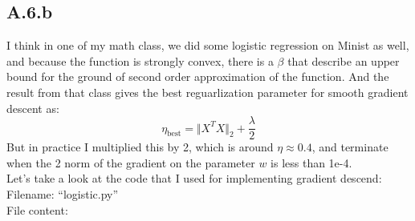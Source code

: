 \documentclass[]{article}
\begin{document}
    \subsection*{A.6.b}
        I think in one of my math class, we did some logistic regression on Minist as well, and because the function is strongly convex, there is a $\beta$ that describe an upper bound for the ground of second order approximation of the function. And the result from that class gives the best reguarlization parameter for smooth gradient descent as: 
        $$ 
            \eta_\text{best} = \Vert X^TX\Vert_2 + \frac{\lambda}{2}
        $$
        But in practice I multiplied this by 2, which is around $\eta \approx 0.4$, and terminate when the 2 norm of the gradient on the parameter $w$ is less than 1e-4.
        \\
        Let's take a look at the code that I used for implementing gradient descend: 
        \\
        Filename: ``logistic.py''
        \\
        File content: 
\end{document}
